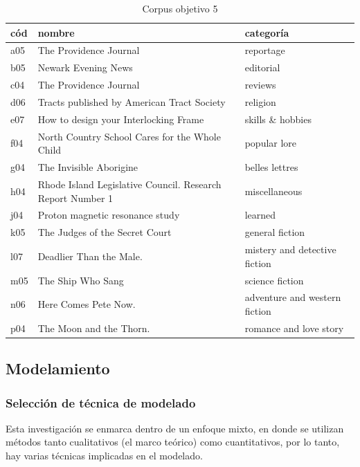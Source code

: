 \documentclass[twoside]{article}
\begin{document}
      \begin{table}[!ht]
    \centering

    \begin{tabular}{|l|l|l|}
    \hline
      cód & nombre & categoría \\ \hline
      a05 & The Providence Journal & reportage \\ \hline
      b05 & Newark Evening News & editorial \\ \hline
      c04 & The Providence Journal & reviews \\ \hline
      d06 & Tracts published by American Tract Society & religion \\ \hline
      e07 & How to design your Interlocking Frame & skills \& hobbies \\ \hline
      f04 & North Country School Cares for the Whole Child & popular lore \\ \hline
      g04 & The Invisible Aborigine & belles lettres \\ \hline
      h04 & Rhode Island Legislative Council. Research Report Number 1 & miscellaneous \\ \hline
      j04 & Proton magnetic resonance study & learned \\ \hline
      k05 & The Judges of the Secret Court & general fiction \\ \hline
      l07 & Deadlier Than the Male. & mistery and detective fiction \\ \hline
      m05 & The Ship Who Sang & science fiction \\ \hline
      n06 & Here Comes Pete Now. & adventure and western fiction \\ \hline
      p04 & The Moon and the Thorn. & romance and love story \\ \hline

    \end{tabular}
\caption{Corpus objetivo 5}
\label{tab:corpus_objetivo5}
\end{table}
\subsection{Modelamiento}
\label{sec:org13ef579}
\subsubsection{Selección de técnica de modelado}
\label{sec:orgf5d3263}

Esta investigación se enmarca dentro de un enfoque mixto, en
donde se utilizan métodos tanto cualitativos (el marco teórico) como
cuantitativos, por lo tanto, hay varias técnicas implicadas  en el modelado.
\end{document}
